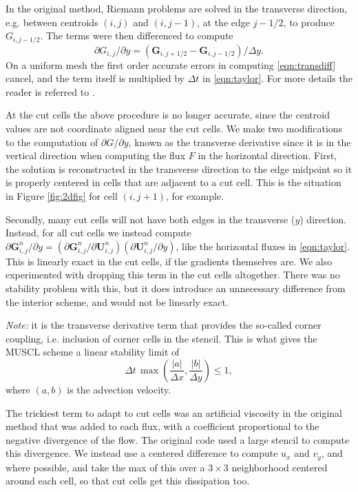 In the original method,
Riemann problems are solved in the transverse direction, e.g. between
centroids $(i,j)$ and $(i,j-1)$, at the edge $j-1/2$, to produce
$G_{i,j-1/2}$. 
The terms were then differenced to compute 
\begin{equation}
\partial G_{i,j}/\partial y =  (\mathbf{G}_{i,j+1/2} - \mathbf{G}_{i,j-1/2})/\Delta y .
\label{eqn:transdiff}
\end{equation}
On a uniform mesh 
the first order accurate errors in computing \eqref{eqn:transdiff} 
cancel, and the term itself is 
multiplied by $\Delta t$ in \eqref{eqn:taylor}.
For more details the reader is referred to \cite{Colella:Unsplit}.

At the cut cells the above procedure is no longer accurate,
since  the centroid values are not coordinate aligned near
the cut cells.
We make two modifications to the
computation of $\partial G/\partial y$, known as the
transverse derivative since it is in the vertical direction
when computing the flux $F$ in the horizontal direction.
First,
the solution is reconstructed in the transverse direction
to the edge midpoint so it is properly centered in cells that
are adjacent to a cut cell.  This is the situation
in Figure \ref{fig:2dfig} for cell $(i,j+1)$, for example.

Secondly, many cut cells will not have both edges in the
transverse ($y$) direction. Instead, for all cut cells we
instead compute
$ \partial \mathbf{G}_{i,j}^n / \partial y = ( \partial \mathbf{G}_{i,j}^n / \partial \mathbf{U}_{i,j}^n)( \partial \mathbf{U}_{i,j}^n / \partial y)$,
like the horizontal fluxes in \eqref{eqn:taylor}. This is linearly exact in the cut cells, 
if the gradients themselves are.
We also experimented with dropping this term in the cut cells
altogether. There was no stability problem with this, but it
does introduce an unnecessary difference from
the interior scheme, and would not be linearly exact.

\textit{Note:} it is the transverse derivative term that provides the so-called corner 
coupling, i.e. inclusion
of corner cells in the stencil. This is what  gives  the MUSCL scheme a linear stability limit of
\begin{equation}
\label{eqn:bigcfllimit}
\Delta t \, \max \left (\frac{|a|}{\Delta x} , \frac{|b|}{\Delta y} \right) \leq 1,
\end{equation}
where $(a,b)$ is the advection velocity.  

The trickiest term to adapt to cut cells was an artificial viscosity in the original method that was 
added to each flux, with a
coefficient proportional to the negative divergence of the flow.  The original
code used a large stencil to compute this divergence. We instead use a centered
difference to compute $u_x$ and $v_y$, and where possible, and  
take the max of this over a $3 \times  3$
neighborhood centered around each cell, so that cut cells get this dissipation too. 


